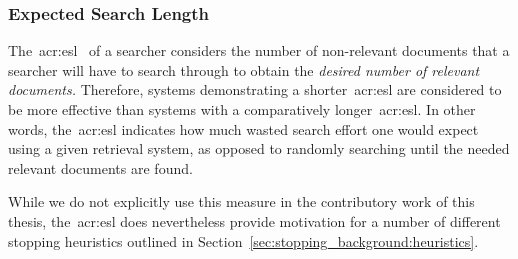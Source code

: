 %
%
%
%

\subsubsection{Expected Search Length}\label{sec:ir_background:evaluation:system:esl}
The~\gls{acr:esl}~\citep{cooper1968expected_search_length} of a searcher considers the number of non-relevant documents that a searcher will have to search through to obtain the \emph{desired number of relevant documents.} Therefore, systems demonstrating a shorter~\gls{acr:esl} are considered to be more effective than systems with a comparatively longer~\gls{acr:esl}. In other words, the~\gls{acr:esl} indicates how much wasted search effort one would expect using a given retrieval system, as opposed to randomly searching until the needed relevant documents are found.

%
%

While we do not explicitly use this measure in the contributory work of this thesis, the~\gls{acr:esl} does nevertheless provide motivation for a number of different stopping heuristics outlined in Section~\ref{sec:stopping_background:heuristics}.

